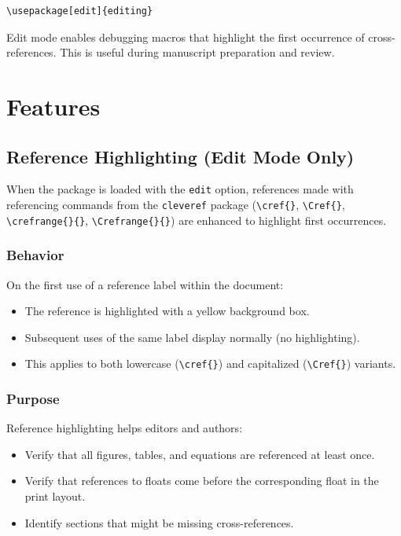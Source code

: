 \documentclass[11pt]{article}
\begin{document}
\begin{verbatim}
\usepackage[edit]{editing}
\end{verbatim}

Edit mode enables debugging macros that highlight the first occurrence of cross-references. 
This is useful during manuscript preparation and review.

\section{Features}

\subsection{Reference Highlighting (Edit Mode Only)}

When the package is loaded with the \verb|edit| option, 
references made with referencing commands from the \verb|cleveref| package 
(\verb|\cref{}|, \verb|\Cref{}|, \verb|\crefrange{}{}|, 
\verb|\Crefrange{}{}|) are enhanced to highlight first occurrences.

\subsubsection{Behavior}

On the first use of a reference label within the document:
\begin{itemize}
  \item The reference is highlighted with a yellow background box.
  \item Subsequent uses of the same label display normally (no highlighting).
  \item This applies to both lowercase (\verb|\cref{}|) and capitalized (\verb|\Cref{}|) variants.
\end{itemize}

\subsubsection{Purpose}

Reference highlighting helps editors and authors:
\begin{itemize}
  \item Verify that all figures, tables, and equations are referenced at least once.
  \item Verify that references to floats come before the corresponding float in the print layout.
  \item Identify sections that might be missing cross-references.
\end{itemize}
\end{document}
